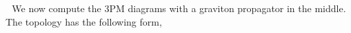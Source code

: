 \textbullet $\,\,$ We now compute the 3PM diagrams with a graviton propagator in the middle. The topology has the following form,
